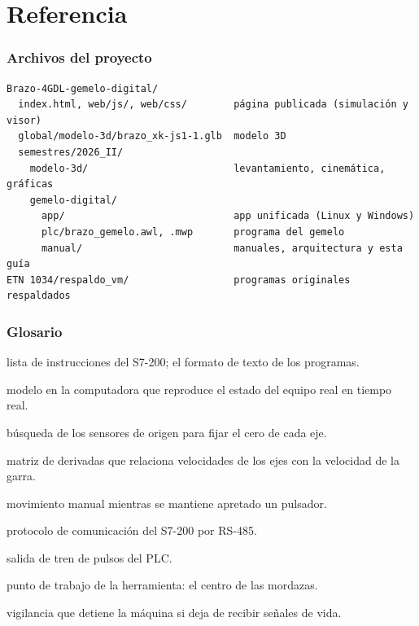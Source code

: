 \documentclass[a4paper,11pt]{article}
\begin{document}
\part{Referencia}

\section{Archivos del proyecto}
\begin{lstlisting}
Brazo-4GDL-gemelo-digital/
  index.html, web/js/, web/css/        página publicada (simulación y visor)
  global/modelo-3d/brazo_xk-js1-1.glb  modelo 3D
  semestres/2026_II/
    modelo-3d/                         levantamiento, cinemática, gráficas
    gemelo-digital/
      app/                             app unificada (Linux y Windows)
      plc/brazo_gemelo.awl, .mwp       programa del gemelo
      manual/                          manuales, arquitectura y esta guía
ETN 1034/respaldo_vm/                  programas originales respaldados
\end{lstlisting}

\section{Glosario}
\begin{description}[leftmargin=3.2cm, style=nextline]
\item[AWL] lista de instrucciones del S7-200; el formato de texto de los programas.
\item[Gemelo digital] modelo en la computadora que reproduce el estado del equipo real en tiempo real.
\item[Homing] búsqueda de los sensores de origen para fijar el cero de cada eje.
\item[Jacobiano] matriz de derivadas que relaciona velocidades de los ejes con la velocidad de la garra.
\item[Jog] movimiento manual mientras se mantiene apretado un pulsador.
\item[PPI] protocolo de comunicación del S7-200 por RS-485.
\item[PTO] salida de tren de pulsos del PLC.
\item[TCP] punto de trabajo de la herramienta: el centro de las mordazas.
\item[Watchdog] vigilancia que detiene la máquina si deja de recibir señales de vida.
\end{description}
\end{document}
